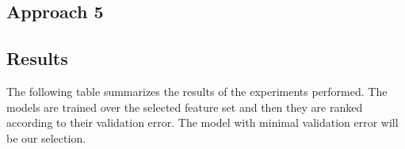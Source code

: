 \subsection{Approach 5}

\subsection{Results}

The following table summarizes the results of the experiments performed. The models are trained over the selected feature set and then they are ranked according to their validation error. The model with minimal validation error will be our selection. 

%

